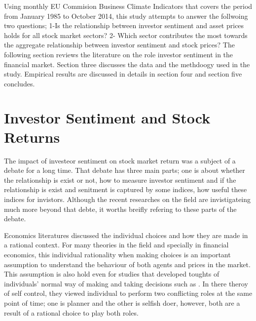 \documentclass[12pt]{article}																																															%
\begin{document}
\par Using monthly EU Commision Business Climate Indicators that covers the period from January 1985 to October 2014, this study attempts to answer the follwoing two questions; 1-Is the relationship between investor sentiment and asset prices holds for all stock market sectors? 2- Which sector contributes the most towards the aggregate relationship between investor sentiment and stock prices? The following section reviews the literature on the role investor sentiment in the financial market. Section three discusses the data and the methdoogy used in the study. Empirical results are discussed in details in section four and section five concludes.

\section{Investor Sentiment and Stock Returns}
The impact of investeor sentiment on stock market return was a subject of a debate for a long time. That debate has three main parts; one is about whether the relationship is exist or not, how to measure investor sentiment and if the relationship is exist and senitment is captured by some indices, how useful these indices for invistors. Although the recent researches on the field are invistigateing much more beyond that debte, it worths breifly refering to these parts of the debate.
\par Economics literatures discussed the individual choices and how they are made in a rational context. For many theories in the field and specially in financial economics, this individual rationality when making choices is an important assumption to understand the behaviour of both agents and prices in the market. This assumption is also hold even for studies that developed toughts of individuals' normal way of making and taking decisions such as \cite{Thaler1981}. In there theroy of self control, they viewed individual to perform two conflicting roles at the same point of time; one is planner and the other is selfish doer, however, both are a result of a rational choice to play both roles. 
\end{document}
